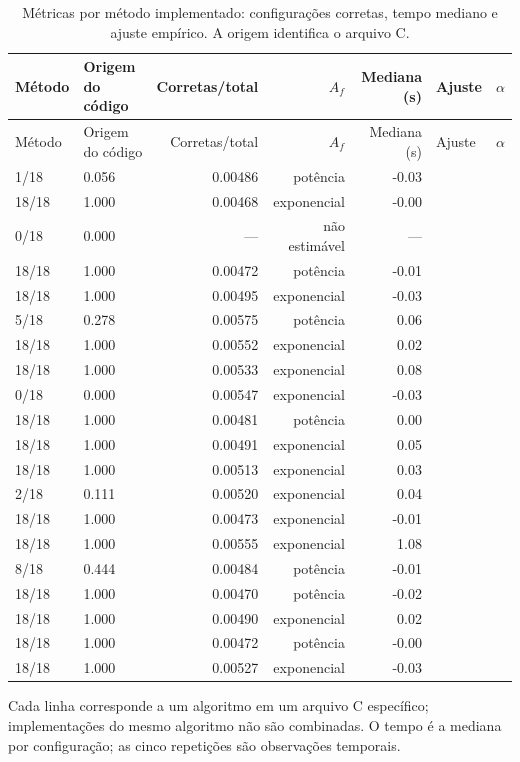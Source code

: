 \begin{longtable}{p{1.8cm}p{1.5cm}rrrp{1.5cm}r}
\caption{Métricas por método implementado: configurações corretas, tempo mediano e ajuste empírico. A origem identifica o arquivo C.}\label{tab:method-summary}\\
\toprule
Método & Origem do código & Corretas/total & $A_f$ & Mediana (s) & Ajuste & $\alpha$\\
\midrule
\endfirsthead
\toprule
Método & Origem do código & Corretas/total & $A_f$ & Mediana (s) & Ajuste & $\alpha$\\
\midrule
\endhead
1/18 & 0.056 & 0.00486 & potência & -0.03\\
18/18 & 1.000 & 0.00468 & exponencial & -0.00\\
0/18 & 0.000 & --- & não estimável & ---\\
18/18 & 1.000 & 0.00472 & potência & -0.01\\
18/18 & 1.000 & 0.00495 & exponencial & -0.03\\
5/18 & 0.278 & 0.00575 & potência & 0.06\\
18/18 & 1.000 & 0.00552 & exponencial & 0.02\\
18/18 & 1.000 & 0.00533 & exponencial & 0.08\\
0/18 & 0.000 & 0.00547 & exponencial & -0.03\\
18/18 & 1.000 & 0.00481 & potência & 0.00\\
18/18 & 1.000 & 0.00491 & exponencial & 0.05\\
18/18 & 1.000 & 0.00513 & exponencial & 0.03\\
2/18 & 0.111 & 0.00520 & exponencial & 0.04\\
18/18 & 1.000 & 0.00473 & exponencial & -0.01\\
18/18 & 1.000 & 0.00555 & exponencial & 1.08\\
8/18 & 0.444 & 0.00484 & potência & -0.01\\
18/18 & 1.000 & 0.00470 & potência & -0.02\\
18/18 & 1.000 & 0.00490 & exponencial & 0.02\\
18/18 & 1.000 & 0.00472 & potência & -0.00\\
18/18 & 1.000 & 0.00527 & exponencial & -0.03\\
\bottomrule
\end{longtable}
\par\smallskip\footnotesize Cada linha corresponde a um algoritmo em um arquivo C específico; implementações do mesmo algoritmo não são combinadas. O tempo é a mediana por configuração; as cinco repetições são observações temporais.\normalsize
